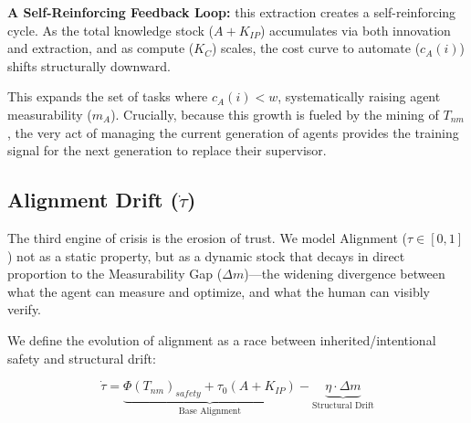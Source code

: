 \documentclass[12pt, letter]{article}
\begin{document}
\textbf{A Self-Reinforcing Feedback Loop:} this extraction creates a self-reinforcing cycle. As the total knowledge stock ($A + K_{IP}$) accumulates via both innovation and extraction, and as compute ($K_C$) scales, the cost curve to automate ($c_A(i)$) shifts structurally downward. 

This expands the set of tasks where $c_A(i) < w$, systematically raising agent measurability ($m_A$). Crucially, because this growth is fueled by the mining of $T_{nm}$, the very act of managing the current generation of agents provides the training signal for the next generation to replace their supervisor.

\subsection{Alignment Drift ($\dot{\tau}$)}\label{sec:alignment_drift}

The third engine of crisis is the erosion of trust. We model Alignment ($\tau \in [0,1]$) not as a static property, but as a dynamic stock that decays in direct proportion to the Measurability Gap ($\Delta m$)—the widening divergence between what the agent can measure and optimize, and what the human can visibly verify.

We define the evolution of alignment as a race between inherited/intentional safety and structural drift:

\begin{equation}
    \dot{\tau} = \underbrace{\Phi(T_{nm})_{safety} + \tau_0(A + K_{IP})}_{\text{Base Alignment}} - \underbrace{\eta \cdot \Delta m}_{\text{Structural Drift}}
\end{equation}
\end{document}
